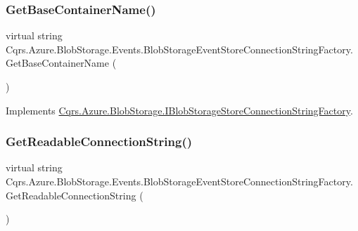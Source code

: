 \subsubsection{\texorpdfstring{Get\+Base\+Container\+Name()}{GetBaseContainerName()}}
{\footnotesize\ttfamily virtual string Cqrs.\+Azure.\+Blob\+Storage.\+Events.\+Blob\+Storage\+Event\+Store\+Connection\+String\+Factory.\+Get\+Base\+Container\+Name (\begin{DoxyParamCaption}{ }\end{DoxyParamCaption})\hspace{0.3cm}{\ttfamily [virtual]}}



Implements \hyperlink{interfaceCqrs_1_1Azure_1_1BlobStorage_1_1IBlobStorageStoreConnectionStringFactory_a57145e68e3bda84bc610fa61226a850c_a57145e68e3bda84bc610fa61226a850c}{Cqrs.\+Azure.\+Blob\+Storage.\+I\+Blob\+Storage\+Store\+Connection\+String\+Factory}.

\mbox{\label{classCqrs_1_1Azure_1_1BlobStorage_1_1Events_1_1BlobStorageEventStoreConnectionStringFactory_aa47606e4cd5a71437bed71e07fda53ed_aa47606e4cd5a71437bed71e07fda53ed}} 
\subsubsection{\texorpdfstring{Get\+Readable\+Connection\+String()}{GetReadableConnectionString()}}
{\footnotesize\ttfamily virtual string Cqrs.\+Azure.\+Blob\+Storage.\+Events.\+Blob\+Storage\+Event\+Store\+Connection\+String\+Factory.\+Get\+Readable\+Connection\+String (\begin{DoxyParamCaption}{ }\end{DoxyParamCaption})\hspace{0.3cm}{\ttfamily [virtual]}}



